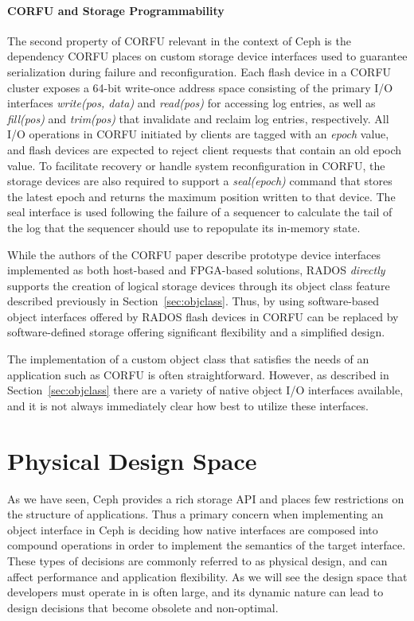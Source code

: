 \documentclass[10pt,twocolumn]{article}
\begin{document}
\paragraph*{CORFU and Storage Programmability}
The second property of CORFU relevant in the context of Ceph is the dependency
CORFU places on custom storage device interfaces used to guarantee
serialization during failure and reconfiguration. Each flash device in a CORFU
cluster exposes a 64-bit write-once address space consisting of the primary I/O
interfaces \emph{write(pos, data)} and \emph{read(pos)} for accessing log
entries, as well as \emph{fill(pos)} and \emph{trim(pos)} that invalidate and
reclaim log entries, respectively. All I/O operations in CORFU initiated by
clients are tagged with an \emph{epoch} value, and flash devices are expected
to reject client requests that contain an old epoch value. To facilitate
recovery or handle system reconfiguration in CORFU, the storage devices are
also required to support a \emph{seal(epoch)} command that stores the latest
epoch and returns the maximum position written to that device. The seal
interface is used following the failure of a sequencer to calculate the tail of
the log that the sequencer should use to repopulate its in-memory state.

While the authors of the CORFU paper describe prototype device interfaces
implemented as both host-based and FPGA-based solutions, RADOS \emph{directly} supports
the creation of logical storage devices through its object class feature
described previously in Section~\ref{sec:objclass}. Thus, by using
software-based object interfaces offered by RADOS flash devices in CORFU can be
replaced by software-defined storage offering significant flexibility and a
simplified design.

The implementation of a custom object class that satisfies the needs of an
application such as CORFU is often straightforward. However, as described in
Section~\ref{sec:objclass} there are a variety of native object I/O interfaces
available, and it is not always immediately clear how best to utilize these
interfaces.

\section{Physical Design Space}

As we have seen, Ceph provides a rich storage API and places few restrictions
on the structure of applications. Thus a primary concern when implementing an
object interface in Ceph is deciding how native interfaces are composed into
compound operations in order to implement the semantics of the target
interface. These types of decisions are commonly referred to as
physical design, and can affect performance and application flexibility.
As we will see the design space that developers must operate in is often
large, and its dynamic nature can lead to design decisions that become
obsolete and non-optimal.
\end{document}
